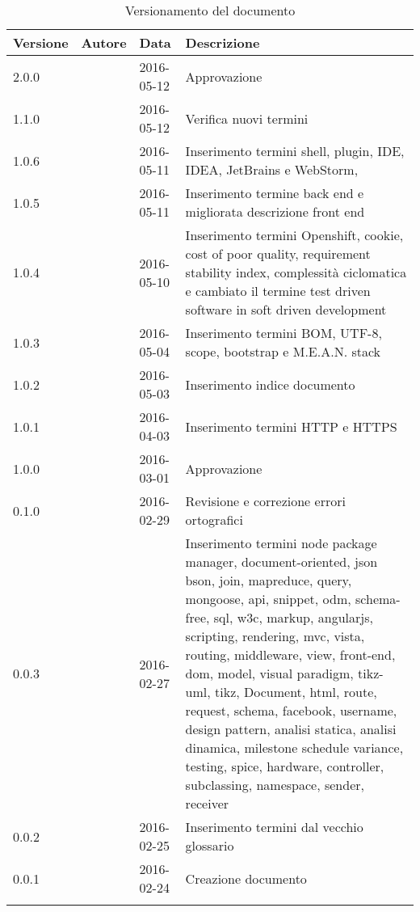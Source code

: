\documentclass[12pt,a4paper]{article}
\begin{document}
\begin{center}
	\begin{longtable}[H]{p{} p{} p{} p{}}
		\toprule
		\textbf{Versione}	&	\textbf{Autore}	&	\textbf{Data}	&	\textbf{Descrizione}\\*
		\midrule
		\midrule
		2.0.0 & \AVE & 2016-05-12 & Approvazione \\*
		\midrule
		1.1.0 & \NDC & 2016-05-12 & Verifica nuovi termini \\*
		\midrule
		1.0.6 & \WS & 2016-05-11  & Inserimento termini shell, plugin, IDE, IDEA, JetBrains e WebStorm,\\*
		1.0.5 & \TP{} & 2016-05-11 & Inserimento termine back end e migliorata descrizione front end \\*
		\midrule
		1.0.4 & \WS & 2016-05-10 & Inserimento termini Openshift, cookie, cost of poor quality, requirement stability index, complessità ciclomatica e cambiato il termine test driven software in soft driven development\\*
		\midrule
		1.0.3 & \WS & 2016-05-04  & Inserimento termini BOM, UTF-8, scope, bootstrap e M.E.A.N. stack \\*
		\midrule
		1.0.2 & \WS & 2016-05-03  & Inserimento indice documento \\*
		\midrule
		1.0.1 & \TP & 2016-04-03  & Inserimento termini HTTP e HTTPS \\*
		\midrule
		1.0.0 & \TP & 2016-03-01  & Approvazione \\*
		\midrule
		0.1.0 & \NDC & 2016-02-29 & Revisione e correzione errori ortografici \\*
		\midrule
		0.0.3 & \AB & 2016-02-27  & Inserimento termini node package manager, document-oriented, json
		bson, join, mapreduce, query, mongoose, api, snippet, odm, schema-free, sql, w3c, markup, angularjs, scripting, rendering, mvc,  vista, routing, middleware, view, front-end, dom, model, visual paradigm, tikz-uml, tikz, Document, html, route, request, schema, facebook, username, design pattern, analisi statica, analisi dinamica, milestone schedule variance,  testing, spice, hardware, controller, subclassing, namespace, sender, receiver \\*
		\midrule
		0.0.2 & \WS & 2016-02-25  & Inserimento termini dal vecchio glossario \\*
		\midrule
		0.0.1 & \WS & 2016-02-24  & Creazione documento \\*
		\bottomrule
		\caption{Versionamento del documento}
		\label{tabVers1}
	\end{longtable}
\end{center}
\end{document}
